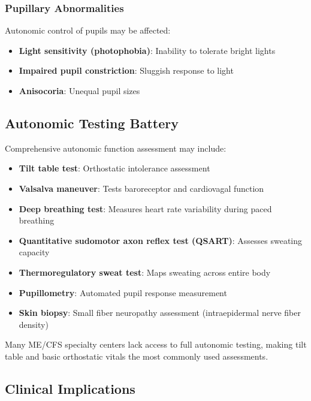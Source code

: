 \subsubsection{Pupillary Abnormalities}

Autonomic control of pupils may be affected:
\begin{itemize}
    \item \textbf{Light sensitivity (photophobia)}: Inability to tolerate bright lights
    \item \textbf{Impaired pupil constriction}: Sluggish response to light
    \item \textbf{Anisocoria}: Unequal pupil sizes
\end{itemize}

\subsection{Autonomic Testing Battery}

Comprehensive autonomic function assessment may include:

\begin{itemize}
    \item \textbf{Tilt table test}: Orthostatic intolerance assessment
    \item \textbf{Valsalva maneuver}: Tests baroreceptor and cardiovagal function
    \item \textbf{Deep breathing test}: Measures heart rate variability during paced breathing
    \item \textbf{Quantitative sudomotor axon reflex test (QSART)}: Assesses sweating capacity
    \item \textbf{Thermoregulatory sweat test}: Maps sweating across entire body
    \item \textbf{Pupillometry}: Automated pupil response measurement
    \item \textbf{Skin biopsy}: Small fiber neuropathy assessment (intraepidermal nerve fiber density)
\end{itemize}

Many ME/CFS specialty centers lack access to full autonomic testing, making tilt table and basic orthostatic vitals the most commonly used assessments.

\subsection{Clinical Implications}

